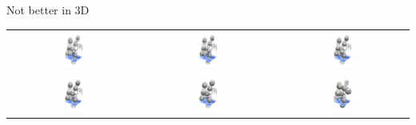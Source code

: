 \documentclass{beamer}
\begin{document}
\begin{frame}{Not better in 3D}
	\begin{center}
	\begin{tabular}{ccc}
	\includegraphics[width=0.18\textwidth]{comp3D_monoscale_r20_crop} & %
	\includegraphics[width=0.18\textwidth]{comp3D_monoscale_r25_crop} & %
	\includegraphics[width=0.18\textwidth]{comp3D_monoscale_r30_crop} \\ 
	\includegraphics[width=0.18\textwidth]{comp3D_monoscale_r35_crop} & %
	\includegraphics[width=0.18\textwidth]{comp3D_monoscale_r40_crop} & %
	\includegraphics[width=0.18\textwidth]{comp3D_monoscale_r45_crop} \\ 
	\end{tabular} 
	\end{center}
\end{frame}
\end{document}
